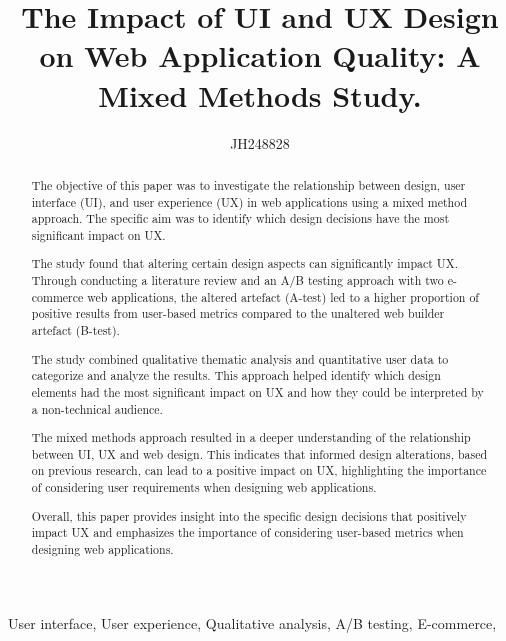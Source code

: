 \documentclass[article]{IEEEtran}
\begin{document}
    \title{The Impact of UI and UX Design on Web Application Quality: A Mixed Methods Study.}
    \author{JH248828}

    \maketitle
    
    \begin{abstract}
        The objective of this paper was to investigate the relationship between design, user interface (UI), and user experience (UX) in web applications using a mixed method approach. The specific aim was to identify which design decisions have the most significant impact on UX.
        
        The study found that altering certain design aspects can significantly impact UX. Through conducting a literature review and an A/B testing approach with two e-commerce web applications, the altered artefact (A-test) led to a higher proportion of positive results from user-based metrics compared to the unaltered web builder artefact (B-test).

        The study combined qualitative thematic analysis and quantitative user data to categorize and analyze the results. This approach helped identify which design elements had the most significant impact on UX and how they could be interpreted by a non-technical audience.

        The mixed methods approach resulted in a deeper understanding of the relationship between UI, UX and web design. This indicates that informed design alterations, based on previous research, can lead to a positive impact on UX, highlighting the importance of considering user requirements when designing web applications.

        Overall, this paper provides insight into the specific design decisions that positively impact UX and emphasizes the importance of considering user-based metrics when designing web applications.
    \end{abstract}
    
    \begin{IEEEkeywords}
        User interface, User experience, Qualitative analysis,  A/B testing, E-commerce,
    \end{IEEEkeywords}
    
\end{document}
